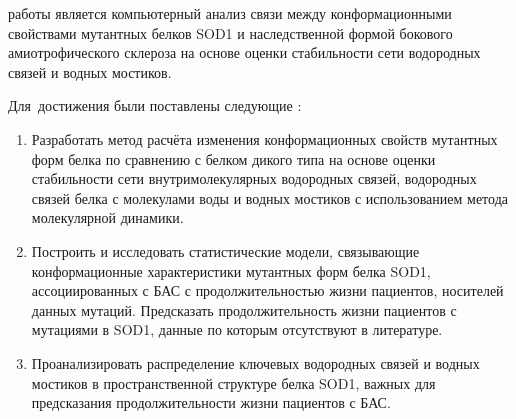 
{\aim} работы является компьютерный анализ связи между конформационными свойствами мутантных белков SOD1 и наследственной формой бокового амиотрофического склероза на основе оценки стабильности сети водородных связей и водных мостиков.

Для~достижения были поставлены следующие {\tasks}:
\begin{enumerate}
  \item Разработать метод расчёта изменения конформационных свойств мутантных форм белка по сравнению с белком дикого типа на основе оценки стабильности сети внутримолекулярных водородных связей, водородных связей белка с молекулами воды и водных мостиков с использованием метода молекулярной динамики.
  \item Построить и исследовать статистические модели, связывающие конформационные характеристики мутантных форм белка SOD1, ассоциированных с БАС с продолжительностью жизни пациентов, носителей данных мутаций. Предсказать продолжительность жизни пациентов с мутациями в SOD1, данные по которым отсутствуют в литературе.
  \item Проанализировать распределение ключевых водородных связей и водных мостиков в пространственной структуре белка SOD1, важных для предсказания продолжительности жизни пациентов с БАС.
\end{enumerate}


